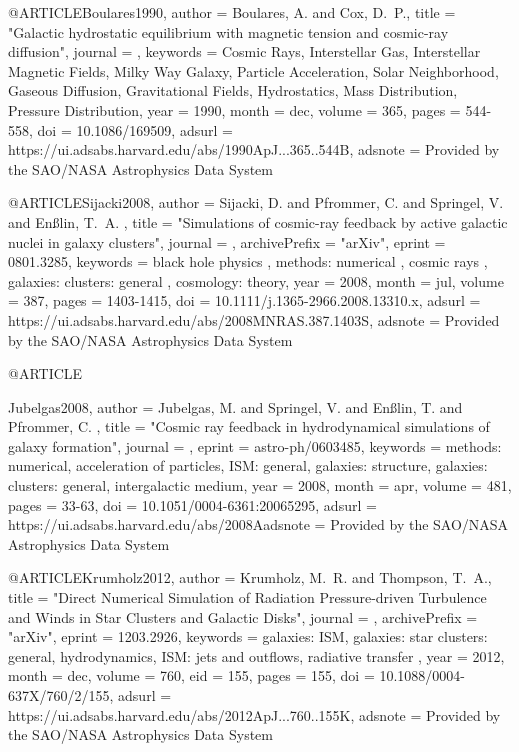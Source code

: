 \documentclass[useAMS,usenatbib]{mnras}
\begin{document}
{{{{{{{{{{{{{@ARTICLE{Boulares1990,
   author = {{Boulares}, A. and {Cox}, D.~P.},
    title = "{Galactic hydrostatic equilibrium with magnetic tension and cosmic-ray diffusion}",
  journal = {\apj},
 keywords = {Cosmic Rays, Interstellar Gas, Interstellar Magnetic Fields, Milky Way Galaxy, Particle Acceleration, Solar Neighborhood, Gaseous Diffusion, Gravitational Fields, Hydrostatics, Mass Distribution, Pressure Distribution},
     year = 1990,
    month = dec,
   volume = 365,
    pages = {544-558},
      doi = {10.1086/169509},
   adsurl = {https://ui.adsabs.harvard.edu/abs/1990ApJ...365..544B},
  adsnote = {Provided by the SAO/NASA Astrophysics Data System}
}

@ARTICLE{Sijacki2008,
   author = {{Sijacki}, D. and {Pfrommer}, C. and {Springel}, V. and {En{\ss}lin}, T.~A.
	},
    title = "{Simulations of cosmic-ray feedback by active galactic nuclei in galaxy clusters}",
  journal = {\mnras},
archivePrefix = "arXiv",
   eprint = {0801.3285},
 keywords = {black hole physics , methods: numerical , cosmic rays , galaxies: clusters: general , cosmology: theory},
     year = 2008,
    month = jul,
   volume = 387,
    pages = {1403-1415},
      doi = {10.1111/j.1365-2966.2008.13310.x},
   adsurl = {https://ui.adsabs.harvard.edu/abs/2008MNRAS.387.1403S},
  adsnote = {Provided by the SAO/NASA Astrophysics Data System}
}

@ARTICLE{Jubelgas2008,
   author = {{Jubelgas}, M. and {Springel}, V. and {En{\ss}lin}, T. and {Pfrommer}, C.
	},
    title = "{Cosmic ray feedback in hydrodynamical simulations of galaxy formation}",
  journal = {\aap},
   eprint = {astro-ph/0603485},
 keywords = {methods: numerical, acceleration of particles, ISM: general, galaxies: structure, galaxies: clusters: general, intergalactic medium},
     year = 2008,
    month = apr,
   volume = 481,
    pages = {33-63},
      doi = {10.1051/0004-6361:20065295},
   adsurl = {https://ui.adsabs.harvard.edu/abs/2008Aadsnote = {Provided by the SAO/NASA Astrophysics Data System}
}

@ARTICLE{Krumholz2012,
   author = {{Krumholz}, M.~R. and {Thompson}, T.~A.},
    title = "{Direct Numerical Simulation of Radiation Pressure-driven Turbulence and Winds in Star Clusters and Galactic Disks}",
  journal = {\apj},
archivePrefix = "arXiv",
   eprint = {1203.2926},
 keywords = {galaxies: ISM, galaxies: star clusters: general, hydrodynamics, ISM: jets and outflows, radiative transfer },
     year = 2012,
    month = dec,
   volume = 760,
      eid = {155},
    pages = {155},
      doi = {10.1088/0004-637X/760/2/155},
   adsurl = {https://ui.adsabs.harvard.edu/abs/2012ApJ...760..155K},
  adsnote = {Provided by the SAO/NASA Astrophysics Data System}
}

}}}}}}}}}}}}}}
\end{document}
